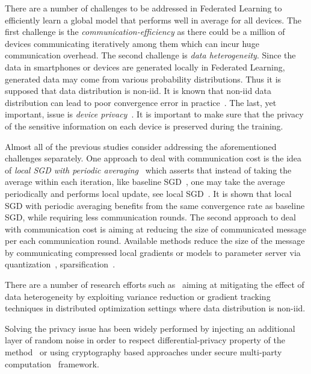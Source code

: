 \documentclass[twoside]{article}
\begin{document}
There are a number of challenges to be addressed in Federated Learning to efficiently learn a global model that performs well in average for all devices. The first challenge is the \emph{communication-efficiency} as there could be a million of devices communicating iteratively among them which can incur huge communication overhead. 
The second challenge is \emph{data heterogeneity}. 
Since the data in smartphones or devices are generated locally in Federated Learning, generated data may come from various probability distributions. Thus it is supposed that data distribution is non-iid. It is known that non-iid data distribution can lead to poor convergence error in practice~\cite{li2019federated,liang2019variance}. The last, yet important, issue is \emph{device privacy}~\cite{geyer2017differentially,hardy2017private}. It is important to make sure that the privacy of the sensitive information on each device is preserved during the training.

Almost all of the previous studies consider addressing the aforementioned challenges separately. One approach to deal with communication cost is the idea of \emph{local SGD with periodic averaging}~\cite{zhou2018convergence,stich2019local,yu2019parallel,wang2018cooperative} which asserts that instead of taking the average within each iteration, like baseline SGD~\cite{bottou-bousquet-2008}, one may take the average periodically and performs local update, see local SGD~\cite{lin2019don}. It is shown that local SGD with periodic averaging benefits from the same convergence rate as baseline SGD, while requiring less communication rounds. The second approach to deal with communication cost is aiming at reducing the size of communicated message per each communication round. Available methods reduce the size of the message by communicating compressed local gradients or models to parameter server via quantization~\cite{alistarh2017qsgd,bernstein2018signsgd,tang2018communication,wen2017terngrad,wu2018error}, sparsification~\cite{alistarh2018convergence,lin2017deep,stich2018sparsified,stich2019error}.%

There are a number of research efforts such as~\cite{liang2019variance,karimireddy2019scaffold,horvath2019stochastic,haddadpour2020federated} aiming at mitigating the effect of data heterogeneity by exploiting variance reduction or gradient tracking techniques in distributed optimization settings where data distribution is non-iid.

Solving the privacy issue has been widely performed by injecting an additional layer of random noise in order to respect differential-privacy property of the method~\cite{mcmahan2017learning} or using cryptography based approaches under secure multi-party computation~\cite{bonawitz2017practical} framework.
\end{document}
